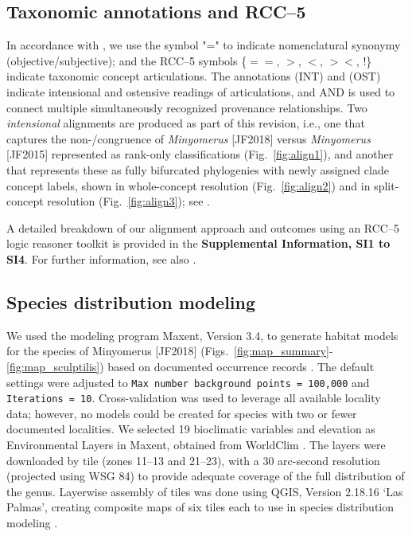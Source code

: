 \documentclass[fleqn,10pt,lineno]{wlpeerj} %
\begin{document}
	\subsection*{Taxonomic annotations and RCC--5}\label{ssec:taxanno} 
		In accordance with \citet{jansen2015}, we use the symbol "=" to indicate nomenclatural synonymy (objective/subjective); and the RCC--5 symbols \{$==$, $>$, $<$, $><$, !\} indicate taxonomic concept articulations. The annotations (INT) and (OST) indicate intensional and ostensive readings of articulations, and AND is used to connect multiple simultaneously recognized provenance relationships.
		Two \emph{intensional} alignments are produced as part of this revision, i.e., one that captures the non-/congruence of \textit{Minyomerus} [JF2018] versus \textit{Minyomerus} [JF2015] represented as rank-only classifications (Fig.~\ref{fig:align1}), and another that represents these as fully bifurcated phylogenies with newly assigned clade concept labels, shown in whole-concept resolution (Fig.~\ref{fig:align2}) and in split-concept resolution (Fig.~\ref{fig:align3}); see \citet{fea2018}.
		
		A detailed breakdown of our alignment approach and outcomes using an RCC--5 logic reasoner toolkit \citep{chen2014} is provided in the \textbf{Supplemental Information, SI1 to SI4}. For further information, see also \citet{jansen2015, fea2016a, fea2016b}.
	
	\subsection*{Species distribution modeling}\label{ssec:dismo} 
		We used the modeling program Maxent, Version 3.4, to generate habitat models for the species of Minyomerus [JF2018] (Figs.~\ref{fig:map_summary}-\ref{fig:map_sculptilis}) based on documented occurrence records \citep{phillips2004, phillips2006, elith2011}.
		The default settings were adjusted to \texttt{Max number background points = 100,000} and \texttt{Iterations = 10}.
		Cross-validation was used to leverage all available locality data; however, no models could be created for species with two or fewer documented localities.
		We selected 19 bioclimatic variables and elevation as Environmental Layers in Maxent, obtained from WorldClim \citep{hijmans2005}.
		The layers were downloaded by tile (zones 11–13 and 21–23), with a 30 arc-second resolution (projected using WSG 84) to provide adequate coverage of the full distribution of the genus.
		Layerwise assembly of tiles was done using QGIS, Version 2.18.16 `Las Palmas', creating composite maps of six tiles each to use in species distribution modeling \citep{qgis2018}.
		
\end{document}

